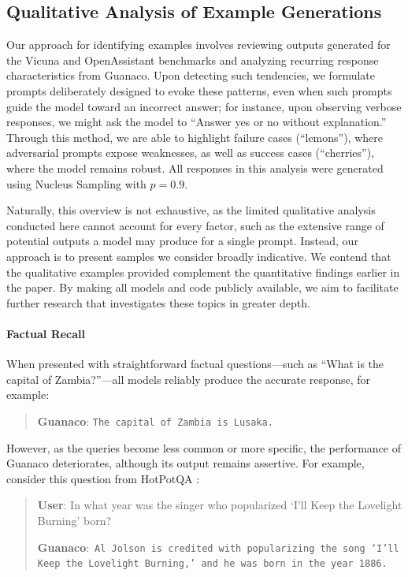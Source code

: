 \subsection{Qualitative Analysis of Example Generations}
\label{ssec:examples}

Our approach for identifying examples involves reviewing outputs generated for the Vicuna and OpenAssistant benchmarks and analyzing recurring response characteristics from {Guanaco}. Upon detecting such tendencies, we formulate prompts deliberately designed to evoke these patterns, even when such prompts guide the model toward an incorrect answer; for instance, upon observing verbose responses, we might ask the model to ``Answer yes or no without explanation.'' Through this method, we are able to highlight failure cases (``lemons''), where adversarial prompts expose weaknesses, as well as success cases (``cherries''), where the model remains robust. All responses in this analysis were generated using Nucleus Sampling \cite{holtzmancurious} with $p=0.9$.

Naturally, this overview is not exhaustive, as the limited qualitative analysis conducted here cannot account for every factor, such as the extensive range of potential outputs a model may produce for a single prompt. Instead, our approach is to present samples we consider broadly indicative. We contend that the qualitative examples provided complement the quantitative findings earlier in the paper. By making all models and code publicly available, we aim to facilitate further research that investigates these topics in greater depth.

\paragraph{Factual Recall} When presented with straightforward factual questions—such as ``What is the capital of Zambia?''—all models reliably produce the accurate response, for example:

\begin{quote} 
    \textbf{Guanaco}:
    \texttt{The capital of Zambia is Lusaka.}
\end{quote}

However, as the queries become less common or more specific, the performance of {Guanaco} deteriorates, although its output remains assertive. For example, consider this question from HotPotQA \citep{yang2018hotpotqa}:

\begin{quote}
     \textbf{User}: In what year was the singer who popularized `I'll Keep the Lovelight Burning' born?  

     \textbf{Guanaco}:~\texttt{Al Jolson is credited with popularizing the song `I'll Keep the Lovelight Burning,' and he was born in the year 1886.}
 \end{quote}

